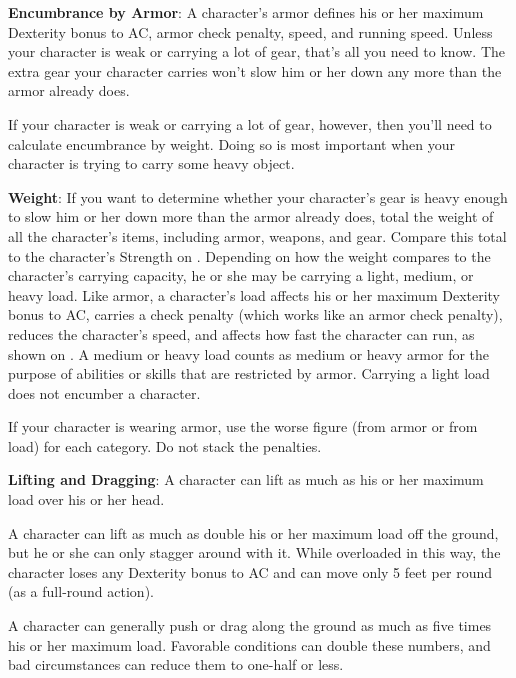 \textbf{Encumbrance by Armor}: A character’s armor defines his or her maximum Dexterity bonus to AC, armor check penalty, speed, and running speed. Unless your character is weak or carrying a lot of gear, that’s all you need to know. The extra gear your character carries won’t slow him or her down any more than the armor already does.

If your character is weak or carrying a lot of gear, however, then you’ll need to calculate encumbrance by weight. Doing so is most important when your character is trying to carry some heavy object.

\textbf{Weight}: If you want to determine whether your character’s gear is heavy enough to slow him or her down more than the armor already does, total the weight of all the character’s items, including armor, weapons, and gear. Compare this total to the character’s Strength on . Depending on how the weight compares to the character’s carrying capacity, he or she may be carrying a light, medium, or heavy load. Like armor, a character’s load affects his or her maximum Dexterity bonus to AC, carries a check penalty (which works like an armor check penalty), reduces the character’s speed, and affects how fast the character can run, as shown on . A medium or heavy load counts as medium or heavy armor for the purpose of abilities or skills that are restricted by armor. Carrying a light load does not encumber a character.

If your character is wearing armor, use the worse figure (from armor or from load) for each category. Do not stack the penalties.



\textbf{Lifting and Dragging}: A character can lift as much as his or her maximum load over his or her head.

A character can lift as much as double his or her maximum load off the ground, but he or she can only stagger around with it. While overloaded in this way, the character loses any Dexterity bonus to AC and can move only 5 feet per round (as a full-round action).

A character can generally push or drag along the ground as much as five times his or her maximum load. Favorable conditions can double these numbers, and bad circumstances can reduce them to one-half or less.

